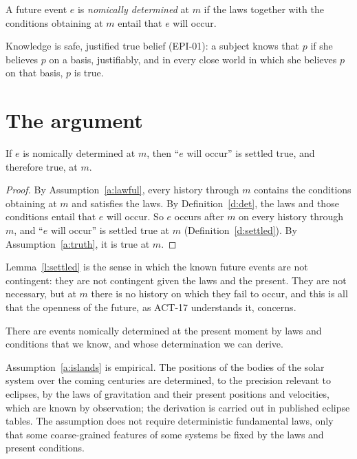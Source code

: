 \documentclass{situationist-preprint}
\begin{document}
\begin{definition}\label{d:det}
A future event $e$ is \emph{nomically determined} at $m$ if the laws together with the conditions obtaining at $m$ entail that $e$ will occur.
\end{definition}

Knowledge is safe, justified true belief (EPI-01): a subject knows that $p$ if she believes $p$ on a basis, justifiably, and in every close world in which she believes $p$ on that basis, $p$ is true.

\section{The argument}

\begin{lemma}\label{l:settled}
If $e$ is nomically determined at $m$, then \enquote{$e$ will occur} is settled true, and therefore true, at $m$.
\end{lemma}

\begin{proof}
By Assumption~\ref{a:lawful}, every history through $m$ contains the conditions obtaining at $m$ and satisfies the laws. By Definition~\ref{d:det}, the laws and those conditions entail that $e$ will occur. So $e$ occurs after $m$ on every history through $m$, and \enquote{$e$ will occur} is settled true at $m$ (Definition~\ref{d:settled}). By Assumption~\ref{a:truth}, it is true at $m$.
\end{proof}

Lemma~\ref{l:settled} is the sense in which the known future events are not contingent: they are not contingent given the laws and the present. They are not necessary, but at $m$ there is no history on which they fail to occur, and this is all that the openness of the future, as ACT-17 understands it, concerns.

\begin{assumption}\label{a:islands}
There are events nomically determined at the present moment by laws and conditions that we know, and whose determination we can derive.
\end{assumption}

Assumption~\ref{a:islands} is empirical. The positions of the bodies of the solar system over the coming centuries are determined, to the precision relevant to eclipses, by the laws of gravitation and their present positions and velocities, which are known by observation; the derivation is carried out in published eclipse tables. The assumption does not require deterministic fundamental laws, only that some coarse-grained features of some systems be fixed by the laws and present conditions.
\end{document}
